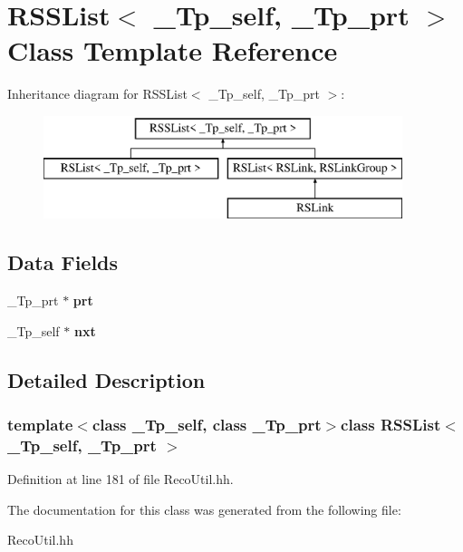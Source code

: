 \section{R\-S\-S\-List$<$ \-\_\-\-Tp\-\_\-self, \-\_\-\-Tp\-\_\-prt $>$ Class Template Reference}
\label{classRSSList}
Inheritance diagram for R\-S\-S\-List$<$ \-\_\-\-Tp\-\_\-self, \-\_\-\-Tp\-\_\-prt $>$\-:\begin{figure}[H]
\begin{center}
\leavevmode
\includegraphics[height=3.000000cm]{classRSSList}
\end{center}
\end{figure}
\subsection*{Data Fields}
\begin{DoxyCompactItemize}
\item 
\-\_\-\-Tp\-\_\-prt $\ast$ {\bfseries prt}\label{classRSSList_a32492faa38b9366095481804cd97bcb4}

\item 
\-\_\-\-Tp\-\_\-self $\ast$ {\bfseries nxt}\label{classRSSList_a871423ffbc31df90605c30c123b2705b}

\end{DoxyCompactItemize}


\subsection{Detailed Description}
\subsubsection*{template$<$class \-\_\-\-Tp\-\_\-self, class \-\_\-\-Tp\-\_\-prt$>$class R\-S\-S\-List$<$ \-\_\-\-Tp\-\_\-self, \-\_\-\-Tp\-\_\-prt $>$}



Definition at line 181 of file Reco\-Util.\-hh.



The documentation for this class was generated from the following file\-:\begin{DoxyCompactItemize}
\item 
Reco\-Util.\-hh\end{DoxyCompactItemize}
